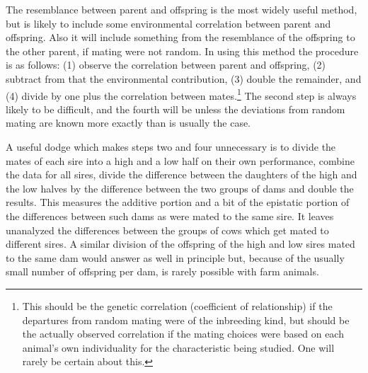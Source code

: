 The resemblance between parent and offspring is the most widely
useful method, but is likely to include some environmental correlation
between parent and offspring. Also it will include something from the
resemblance of the offspring to the other parent, if mating were not
random. In using this method the procedure is as follows: (1) observe
the correlation between parent and offspring, (2) subtract from that the
environmental contribution, (3) double the remainder, and (4) divide
by one plus the correlation between mates.\footnote{This should be the
genetic correlation (coefficient of relationship) if the departures
from random mating were of the inbreeding kind, but should be the actually
observed correlation if the mating choices were based on each animal's own
individuality for the characteristic being studied. One will rarely be
certain about this.} The second step is always likely to be difficult,
and the fourth will be unless the deviations from random mating are known
more exactly than is usually the case.

A useful dodge which makes steps two and four unnecessary is to
divide the mates of each sire into a high and a low half on their own
performance, combine the data for all sires, divide the difference
between the daughters of the high and the low halves by the difference
between the two groups of dams and double the results. This measures
the additive portion and a bit of the epistatic portion of the differences
between such dams as were mated to the same sire. It leaves unanalyzed
the differences between the groups of cows which get mated to different
sires. A similar division of the offspring of the high and low sires mated
to the same dam would answer as well in principle but, because of the
usually small number of offspring per dam, is rarely possible with farm
animals.


